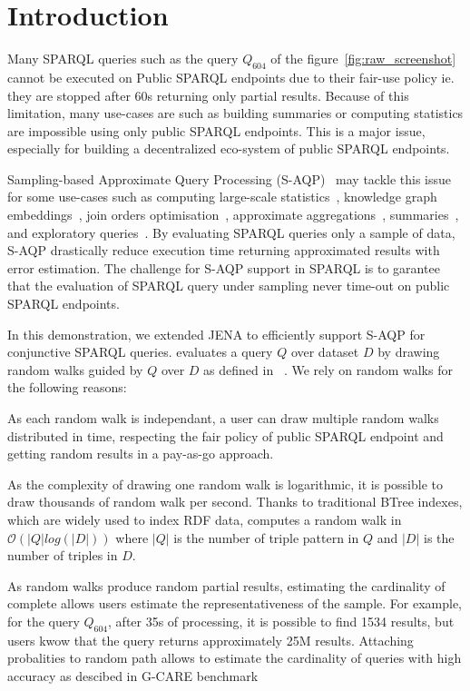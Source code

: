 
\section{Introduction}

Many SPARQL queries such as the query $Q_{604}$ of the
figure~\ref{fig:raw_screenshot} cannot be executed on Public SPARQL
endpoints due to their fair-use policy ie. they are stopped after 60s
returning only partial results. Because of this limitation, many
use-cases are such as building summaries or computing statistics are
impossible using only public SPARQL endpoints. This is a major issue,
especially for building a decentralized eco-system of public SPARQL
endpoints.

Sampling-based Approximate Query Processing
(S-AQP)~\cite{DBLP:conf/sigmod/AgarwalMKTJMMS14} may tackle this issue
for some use-cases such as computing large-scale
statistics~\cite{soulet2019anytime,10.1007/978-3-319-18818-8_14},
knowledge graph embeddings~\cite{ristoski2016rdf2vec}, join orders
optimisation~\cite{DBLP:conf/cidr/LeisRGK017}, approximate
aggregations~\cite{wang2022approximate},
summaries~\cite{10.1007/978-3-030-49461-2_10}, and exploratory
queries~\cite{DBLP:conf/sigmod/AgarwalMKTJMMS14}. By evaluating SPARQL
queries only a sample of data, S-AQP drastically reduce execution time
returning approximated results with error estimation.  The challenge
for S-AQP support in SPARQL is to garantee that the evaluation of
SPARQL query under sampling never time-out on public SPARQL endpoints.

In this demonstration, we extended JENA to efficiently support S-AQP
for conjunctive SPARQL queries. \NAME evaluates a query $Q$ over
dataset $D$ by drawing  random walks guided by $Q$ over $D$ as defined in
\WANDER~\cite{li2019wanderjoin}. We rely on random walks for the
following reasons:
%
\begin{inparaenum}[(i)]
%
\item As each random walk is independant, a
user can draw multiple random walks distributed in time, respecting
the fair policy of public SPARQL endpoint and getting random results
in a pay-as-go approach.
%
\item As the complexity of drawing one random walk is logarithmic, it is
possible to draw thousands of random walk per second. Thanks to
traditional BTree indexes, which are widely used to index RDF data,
\NAME computes a random walk in $\mathcal{O}(|Q|log(|D|))$ where $|Q|$
is the number of triple pattern in $Q$ and $|D|$ is the number of
triples in $D$.
%
\item As random walks produce random partial results, estimating the
cardinality of complete allows users estimate the representativeness
of the sample. For example, for the query $Q_{604}$, after 35s of
processing, it is possible to find 1534 results, but users kwow that
the query returns approximately 25M results. Attaching probalities to random path allows to estimate
the cardinality of queries\cite{li2019wanderjoin} with high accuracy
as descibed in G-CARE benchmark~\cite{DBLP:conf/sigmod/ParkKBKHH20}
\end{inparaenum}


